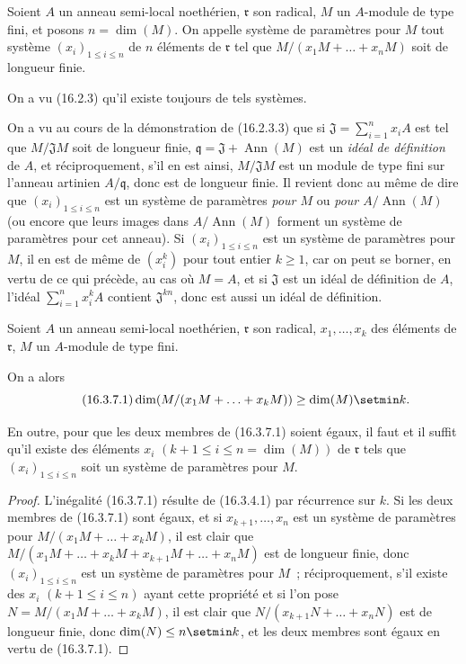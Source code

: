 \begin{definition}[16.3.6]
\label{0.16.3.6-fr}
Soient $A$ un anneau semi-local noethérien, $\mathfrak{r}$ son radical, $M$ un
$A$-module de type fini, et posons $n=\dim(M)$. On appelle système de
paramètres pour $M$ tout système $(x_i)_{1\leq i\leq n}$ de $n$ éléments de
$\mathfrak{r}$ tel que $M/(x_1M+\ldots+x_nM)$ soit de longueur finie.
\end{definition}

On a vu (16.2.3) qu'il existe toujours de tels systèmes.

On a vu au cours de la démonstration de (16.2.3.3) que si
$\mathfrak{J}=\sum_{i=1}^n x_iA$ est tel que $M/\mathfrak{J}M$ soit de
longueur finie, $\mathfrak{q}=\mathfrak{J}+\operatorname{Ann}(M)$ est un
\emph{idéal de définition} de $A$, et réciproquement, s'il en est ainsi,
$M/\mathfrak{J}M$ est un module de type fini sur l'anneau artinien
$A/\mathfrak{q}$, donc est de longueur finie. Il revient donc au même de dire
que $(x_i)_{1\leq i\leq n}$ est un système de paramètres \emph{pour $M$} ou
\emph{pour $A/\operatorname{Ann}(M)$} (ou encore que leurs images dans
$A/\operatorname{Ann}(M)$ forment un système de paramètres pour cet anneau).
Si $(x_i)_{1\leq i\leq n}$ est un système de paramètres pour $M$, il en est de
même de $(x_i^k)$ pour tout entier $k\geq1$, car on peut se borner, en vertu de
ce qui précède, au cas où $M=A$, et si $\mathfrak{J}$ est un idéal de
définition de $A$, l'idéal $\sum_{i=1}^n x_i^kA$ contient
$\mathfrak{J}^{kn}$, donc est aussi un idéal de définition.

\begin{proposition}[16.3.7]
\label{0.16.3.7-fr}
Soient $A$ un anneau semi-local noethérien, $\mathfrak{r}$ son radical,
$x_1,\ldots,x_k$ des éléments de $\mathfrak{r}$, $M$ un $A$-module de type
fini.

On a alors
\begin{equation}
\label{0.16.3.7.1-fr}
\tag{16.3.7.1}
  \dim(M/(x_1M+\ldots+x_kM))\geq\dim(M)\setmin k.
\end{equation}

En outre, pour que les deux membres de \textup{(16.3.7.1)} soient égaux, il faut et il
suffit qu'il existe des éléments $x_i$
$(k+1\leq i\leq n=\dim(M))$ de $\mathfrak{r}$ tels que
$(x_i)_{1\leq i\leq n}$ soit un système de paramètres pour $M$.
\end{proposition}

\begin{proof}
L'inégalité (16.3.7.1) résulte de (16.3.4.1) par récurrence sur $k$. Si les
deux membres de (16.3.7.1) sont égaux, et si $x_{k+1},\ldots,x_n$ est un
système de paramètres pour $M/(x_1M+\ldots+x_kM)$, il est clair que
$M/(x_1M+\ldots+x_kM+x_{k+1}M+\ldots+x_nM)$ est de longueur finie, donc
$(x_i)_{1\leq i\leq n}$ est un système de paramètres pour $M$~;
réciproquement, s'il existe des $x_i$ $(k+1\leq i\leq n)$ ayant cette
propriété et si l'on pose $N=M/(x_1M+\ldots+x_kM)$, il est clair que
$N/(x_{k+1}N+\ldots+x_nN)$ est de longueur finie, donc
$\dim(N)\leq n\setmin k$, et les deux membres sont égaux en vertu de (16.3.7.1).
\end{proof}

